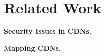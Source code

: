 \section{Related Work}
\label{sec:related}

{\bf Security Issues in CDNs.} ~\cite{chen2016forwarding,triukose2009content,su2008thinning,lesniewski2005ssl,michalakis2007ensuring,levy2015stickler,liang2014https}

{\bf Mapping CDNs.}


